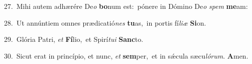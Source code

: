 {\numbfont\textcolor{\numbcolor}{27.}}~Mihi autem adhærére De\textit{o} \textbf{bo}\-num est:~\star pónere in Dómino De\textit{o} \textit{spem} \textbf{me}\-am:\par
{\numbfont\textcolor{\numbcolor}{28.}}~Ut annúntiem omnes prædicatió\textit{nes} \textbf{tu}\-as,~\star in portis fí\-\textit{li}\-\textit{æ} \textbf{Si}\-on.\par
{\numbfont\textcolor{\numbcolor}{29.}}~Glória Patri, \textit{et} \textbf{Fí}\-lio,~\star et Spirí\-\textit{tu}\-\textit{i} \textbf{Sanc}\-to.\par
{\numbfont\textcolor{\numbcolor}{30.}}~Sicut erat in princípio, et nunc, \textit{et} \textbf{sem}\-per,~\star et in sǽcula sæcu\-\textit{ló}\-\textit{rum}. \textbf{A}\-men.\par
